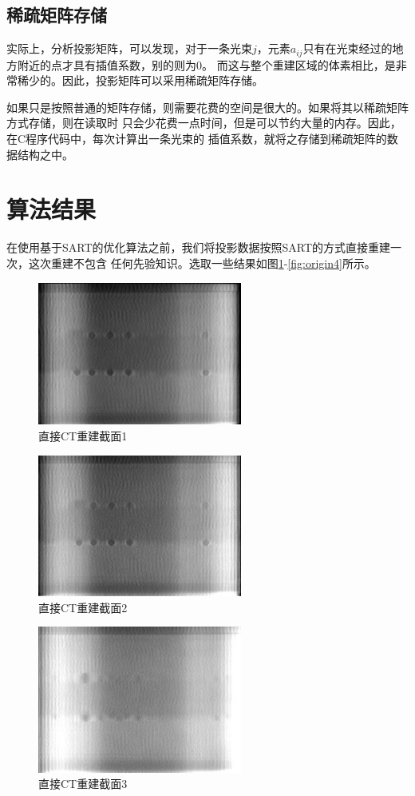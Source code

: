 \subsection{稀疏矩阵存储}
实际上，分析投影矩阵，可以发现，对于一条光束$j$，元素$a_{ij}$只有在光束经过的地方附近的点才具有插值系数，别的则为$0$。
而这与整个重建区域的体素相比，是非常稀少的。因此，投影矩阵可以采用稀疏矩阵存储。

如果只是按照普通的矩阵存储，则需要花费的空间是很大的。如果将其以稀疏矩阵方式存储，则在读取时
只会少花费一点时间，但是可以节约大量的内存。因此，在C程序代码中，每次计算出一条光束的
插值系数，就将之存储到稀疏矩阵的数据结构之中。
\section{算法结果}
在使用基于SART的优化算法之前，我们将投影数据按照SART的方式直接重建一次，这次重建不包含
任何先验知识。选取一些结果如图\ref{fig:origin1}-\ref{fig:origin4}所示。
\begin{figure}[!ht]
\center
\includegraphics[width=0.6\textwidth]{figure/result/origin1.jpg}
\caption{直接CT重建截面1}\label{fig:origin1}
\end{figure}
\begin{figure}[!ht]
\center
\includegraphics[width=0.6\textwidth]{figure/result/origin2.jpg}
\caption{直接CT重建截面2}\label{fig:origin2}
\end{figure}
\begin{figure}[!ht]
\center
\includegraphics[width=0.6\textwidth]{figure/result/origin3.jpg}
\caption{直接CT重建截面3}\label{fig:origin3}
\end{figure}
